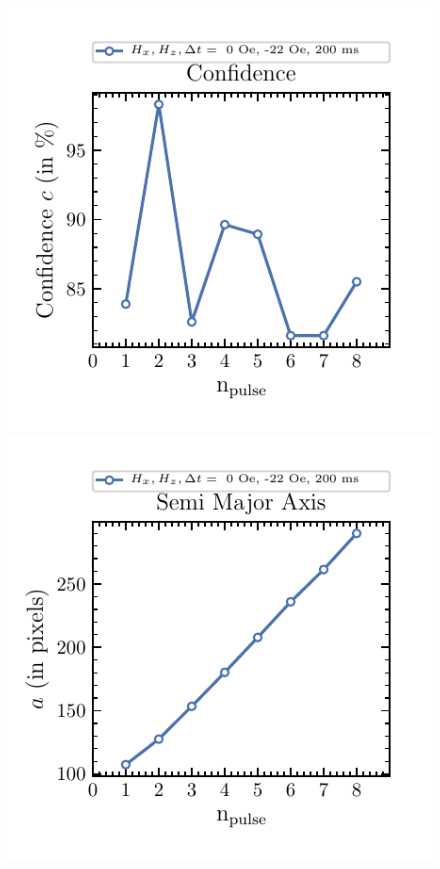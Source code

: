 \documentclass[12pt, twoside, a4paper]{article}
\begin{document}
\begin{figure}[!htbp]
	\centering
	\includegraphics[scale=1.0]{figures/10_FitsSingleIteration/6__Confidence.pdf}\\
	\includegraphics[scale=1.0]{figures/10_FitsSingleIteration/6__Semi-Major-Axis.pdf}

\end{figure}
\end{document}
